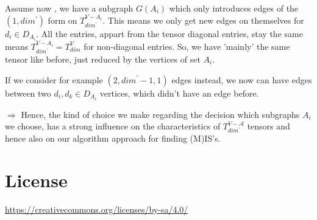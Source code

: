 \documentclass{article}
\newtheorem*{theorem A}{Theorem A}
\newtheorem*{theorem B}{N\"olker's Theorem}
\theoremstyle{remark}
\theoremstyle{remark}
\begin{document}
\vspace{0.3cm}
Assume now , we have a subgraph $G\left(A_{i}\right)$ which only introduces edges of the $\left(1, dim^{\prime}\right)$ form on $T^{V - A_{i}}_{dim^{\prime}}$. This means we only get new edges on themselves for $d_{i} \in D_{A_{i}}$. All the entries, appart from the tensor diagonal entries, stay the same means $T^{V - A_{i}}_{dim^{\prime}} = T^{V}_{dim}$ for non-diagonal entries. So, we have 'mainly' the same tensor like before, just reduced by the vertices of set $A_{i}$.

\vspace{0.3cm}
If we consider for example $\left(2, dim^{\prime} - 1, 1\right)$ edges instead, we now can have edges between two $d_{i}, d_{k} \in D_{A_{i}}$ vertices, which didn't have an edge before.

\vspace{0.3cm}
$\Rightarrow$ Hence, the kind of choice we make regarding the decision which subgraphs $A_{i}$ we choose, has a strong influence on the characteristics of $T^{V - \mathcal{A}}_{dim^{\prime}}$ tensors and hence also on our algorithm approach for finding (M)IS's.
\section*{License}
\label{s:license}
\begin{center}
	\url{https://creativecommons.org/licenses/by-sa/4.0/}
\end{center}
%
%
%

\nocite{*}


\end{document}
